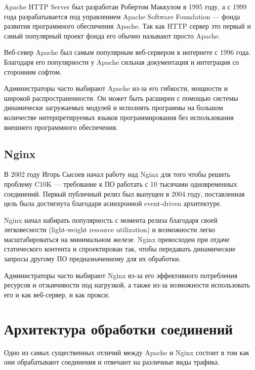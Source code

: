 \documentclass[14pt, a4paper]{article}
\begin{document}
Apache HTTP Server был разработан Робертом Маккулом в 1995 году, а с 1999 года разрабатывается под 
управлением Apache Software Foundation — фонда развития программного обеспечения Apache. 
Так как HTTP сервер это первый и самый популярный проект фонда его обычно называют просто Apache.


Веб-север Apache был самым популярным веб-сервером в интернете с 1996 года. 
Благодаря его популярности у Apache сильная документация и интеграция со сторонним софтом.


Администраторы часто выбирают Apache из-за его гибкости, мощности и широкой распространенности. 
Он может быть расширен с помощью системы динамически загружаемых модулей и исполнять программы 
на большом количестве интерпретируемых языков программирования без использования внешнего программного обеспечения.


\subsection*{Nginx}

В 2002 году Игорь Сысоев начал работу над Nginx для того чтобы решить проблему C10K — требование к 
ПО работать с 10 тысячами одновременных соединений. Первый публичный релиз был выпущен в 2004 году,
поставленная цель была достигнута благодаря асинхронной event-driven архитектуре.


Nginx начал набирать популярность с момента релиза благодаря своей легковесности 
(light-weight resource utilization) и возможности легко масштабироваться на минимальном железе.
Nginx превосходен при отдаче статического контента и спроектирован так, чтобы передавать динамические 
запросы другому ПО предназначенному для их обработки.


Администраторы часто выбирают Nginx из-за его эффективного потребления ресурсов и отзывчивости под нагрузкой,
а также из-за возможности использовать его и как веб-сервер, и как прокси.\\




\section*{Архитектура обработки соединений}
Одно из самых существенных отличий между Apache и Nginx состоит в том как они обрабатывают соединения 
и отвечают на различные виды трафика.
\end{document}
